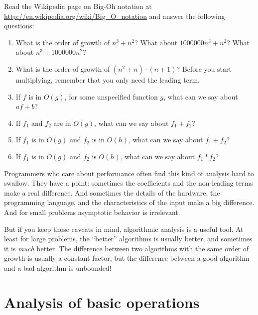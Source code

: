 \documentclass[10pt]{book}
\begin{document}
\begin{exercise}

Read the Wikipedia page on Big-Oh notation at
\url{http://en.wikipedia.org/wiki/Big_O_notation} and
answer the following questions:

\begin{enumerate}

\item What is the order of growth of $n^3 + n^2$?
What about $1000000 n^3 + n^2$?
What about $n^3 + 1000000 n^2$?

\item What is the order of growth of $(n^2 + n) \cdot (n + 1)$?  Before
  you start multiplying, remember that you only need the leading term.

\item If $f$ is in $O(g)$, for some unspecified function $g$, what can
  we say about $a f + b$?

\item If $f_1$ and $f_2$ are in $O(g)$, what can we say about $f_1 + f_2$?

\item If  $f_1$ is in $O(g)$
and $f_2$ is in $O(h)$,
what can we say about  $f_1 + f_2$?

\item If  $f_1$ is in $O(g)$ and $f_2$ is $O(h)$,
what can we say about  $f_1 * f_2$?

\end{enumerate}

\end{exercise}


Programmers who care about performance often find this kind of
analysis hard to swallow.  They have a point: sometimes the
coefficients and the non-leading terms make a real difference.  And
sometimes the details of the hardware, the programming language, and
the characteristics of the input make a big difference.  And for small
problems asymptotic behavior is irrelevant.

But if you keep those caveats in mind, algorithmic analysis is a
useful tool.  At least for large problems, the ``better'' algorithms
is usually better, and sometimes it is {\em much} better.  The
difference between two algorithms with the same order of growth is
usually a constant factor, but the difference between a good algorithm
and a bad algorithm is unbounded!


\section{Analysis of basic operations}
\end{document}
